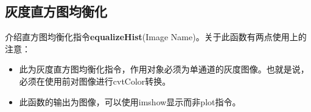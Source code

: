 \documentclass[11pt]{article}
\begin{document}
    \begin{center}
    \end{center}
    
\subsection{灰度直方图均衡化}
介绍直方图均衡化指令\textbf{equalizeHist}(Image Name)。关于此函数有两点使用上的注意：
\begin{itemize}
	\item 此为灰度直方图均衡化指令，作用对象必须为单通道的灰度图像。也就是说，必须在使用前对图像进行cvtColor转换。
	\item 此函数的输出为图像，可以使用imshow显示而非plot指令。
\end{itemize}
\end{document}

